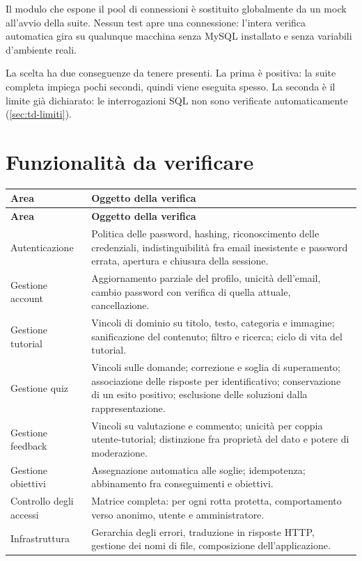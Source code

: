 Il modulo che espone il pool di connessioni è sostituito globalmente da un
mock all'avvio della suite. Nessun test apre una connessione: l'intera
verifica automatica gira su qualunque macchina senza MySQL installato e senza
variabili d'ambiente reali.

La scelta ha due conseguenze da tenere presenti. La prima è positiva: la
suite completa impiega pochi secondi, quindi viene eseguita spesso. La
seconda è il limite già dichiarato: le interrogazioni SQL non sono verificate
automaticamente (\cref{sec:td-limiti}).

\section{Funzionalità da verificare}

\begin{longtable}{@{}L{4.4cm} L{10.0cm}@{}}
\toprule
\textbf{Area} & \textbf{Oggetto della verifica} \\
\midrule
\endfirsthead
\toprule
\textbf{Area} & \textbf{Oggetto della verifica} \\
\midrule
\endhead
\bottomrule
\endlastfoot

Autenticazione &
Politica delle password, hashing, riconoscimento delle credenziali,
indistinguibilità fra email inesistente e password errata, apertura e
chiusura della sessione. \\

Gestione account &
Aggiornamento parziale del profilo, unicità dell'email, cambio password con
verifica di quella attuale, cancellazione. \\

Gestione tutorial &
Vincoli di dominio su titolo, testo, categoria e immagine; sanificazione del
contenuto; filtro e ricerca; ciclo di vita del tutorial. \\

Gestione quiz &
Vincoli sulle domande; correzione e soglia di superamento; associazione delle
risposte per identificativo; conservazione di un esito positivo; esclusione
delle soluzioni dalla rappresentazione. \\

Gestione feedback &
Vincoli su valutazione e commento; unicità per coppia utente-tutorial;
distinzione fra proprietà del dato e potere di moderazione. \\

Gestione obiettivi &
Assegnazione automatica alle soglie; idempotenza; abbinamento fra
conseguimenti e obiettivi. \\

Controllo degli accessi &
Matrice completa: per ogni rotta protetta, comportamento verso anonimo,
utente e amministratore. \\

Infrastruttura &
Gerarchia degli errori, traduzione in risposte HTTP, gestione dei nomi di
file, composizione dell'applicazione. \\

\end{longtable}

